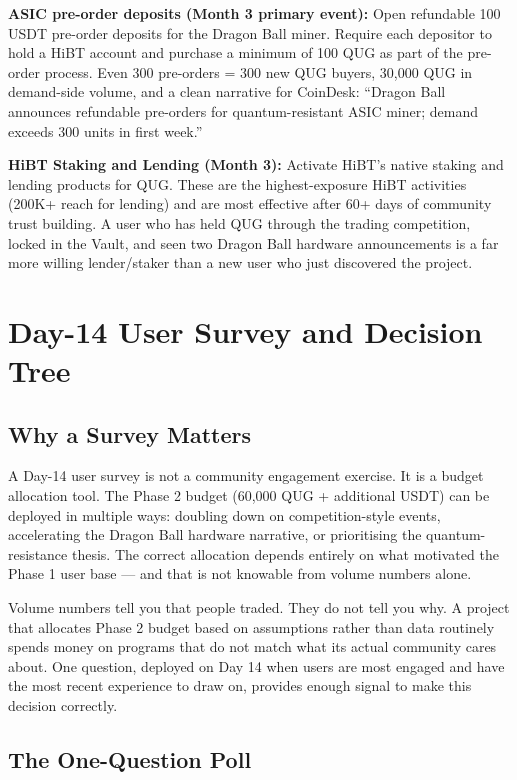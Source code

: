 \documentclass[11pt,a4paper]{article}
\begin{document}
\textbf{ASIC pre-order deposits (Month 3 primary event):} Open refundable 100 USDT pre-order deposits for the Dragon Ball miner. Require each depositor to hold a HiBT account and purchase a minimum of 100 QUG as part of the pre-order process. Even 300 pre-orders = 300 new QUG buyers, 30,000 QUG in demand-side volume, and a clean narrative for CoinDesk: ``Dragon Ball announces refundable pre-orders for quantum-resistant ASIC miner; demand exceeds 300 units in first week.''

\textbf{HiBT Staking and Lending (Month 3):} Activate HiBT's native staking and lending products for QUG. These are the highest-exposure HiBT activities (200K+ reach for lending) and are most effective after 60+ days of community trust building. A user who has held QUG through the trading competition, locked in the Vault, and seen two Dragon Ball hardware announcements is a far more willing lender/staker than a new user who just discovered the project.

\section{Day-14 User Survey and Decision Tree}
\label{sec:survey}

\subsection{Why a Survey Matters}

A Day-14 user survey is not a community engagement exercise. It is a budget allocation tool. The Phase 2 budget (60,000 QUG + additional USDT) can be deployed in multiple ways: doubling down on competition-style events, accelerating the Dragon Ball hardware narrative, or prioritising the quantum-resistance thesis. The correct allocation depends entirely on what motivated the Phase 1 user base — and that is not knowable from volume numbers alone.

Volume numbers tell you that people traded. They do not tell you why. A project that allocates Phase 2 budget based on assumptions rather than data routinely spends money on programs that do not match what its actual community cares about. One question, deployed on Day 14 when users are most engaged and have the most recent experience to draw on, provides enough signal to make this decision correctly.

\subsection{The One-Question Poll}
\end{document}
